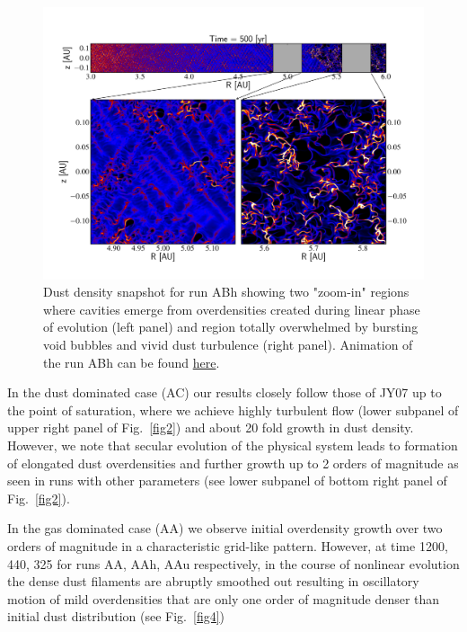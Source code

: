 \begin{figure} 
\includegraphics[width=0.98\linewidth]{figures/fig3}
\caption{Dust density snapshot for run ABh showing two "zoom-in" regions where
cavities emerge from overdensities created during linear phase of evolution
(left panel) and region totally overwhelmed by bursting void bubbles and vivid
dust turbulence (right panel). Animation of the run ABh can be found 
\href{http://youtu.be/NoA5-TiQabQ}{here}.}
\label{fig3}
\end{figure}

\par In the dust dominated case (AC) our results closely follow those of JY07 up
to the point of saturation, where we achieve highly turbulent flow (lower
subpanel of upper right panel of Fig.~\ref{fig2}) and about 20 fold growth
in dust density. However, we note that secular evolution of the physical system
leads to formation of elongated dust overdensities and further growth up to 2
orders of magnitude as seen in runs with other parameters (see lower subpanel of
bottom right panel of Fig.~\ref{fig2}).

\par In the gas dominated case (AA) we observe initial overdensity growth over
two orders of magnitude in a characteristic grid-like pattern.  However, at time
1200, 440, 325 for runs AA, AAh, AAu respectively, in the course of nonlinear
evolution the dense dust filaments are abruptly smoothed out resulting in
oscillatory motion of mild overdensities that are only one order of magnitude
denser than initial dust distribution (see Fig.~\ref{fig4})

